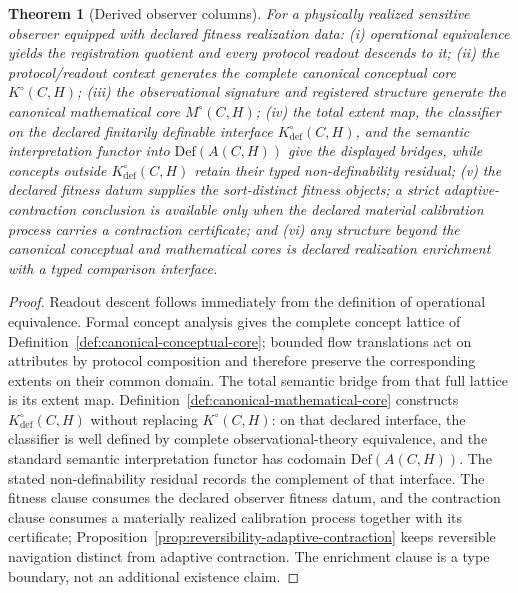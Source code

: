 \documentclass[11pt]{article}
\newtheorem{theorem}{Theorem}
\theoremstyle{definition}
\begin{document}
\begin{theorem}[Derived observer columns]
\label{thm:derived-observer-columns}
For a physically realized sensitive observer equipped with declared fitness
realization data: (i) operational equivalence yields the registration quotient
and every protocol readout descends to it; (ii) the protocol/readout context
generates the complete canonical conceptual core $K^{\circ}(C, H)$; (iii) the
observational signature and registered structure generate the canonical
mathematical core $M^{\circ}(C, H)$; (iv) the total extent map, the classifier
on the declared finitarily definable interface
$K^{\circ}_{\mathrm{def}}(C, H)$, and the semantic interpretation functor into
$\mathrm{Def}(A(C, H))$ give the displayed bridges, while concepts outside
$K^{\circ}_{\mathrm{def}}(C, H)$ retain their typed non-definability residual;
(v) the declared fitness datum supplies the sort-distinct fitness objects; a
strict adaptive-contraction conclusion is available only when the declared
material calibration process carries a contraction certificate; and (vi) any
structure beyond the canonical conceptual and mathematical cores is declared
realization enrichment with a typed comparison interface.
\end{theorem}

\begin{proof}
Readout descent follows immediately from the definition of operational
equivalence. Formal concept analysis gives the complete concept lattice of
Definition~\ref{def:canonical-conceptual-core}; bounded flow translations act
on attributes by protocol composition and therefore preserve the corresponding
extents on their common domain. The total semantic bridge from that full
lattice is its extent map.
Definition~\ref{def:canonical-mathematical-core} constructs
$K^{\circ}_{\mathrm{def}}(C, H)$ without replacing $K^{\circ}(C, H)$: on that
declared interface, the classifier is well defined by complete
observational-theory equivalence, and the standard semantic interpretation
functor has codomain $\mathrm{Def}(A(C, H))$. The stated non-definability
residual records the complement of that interface. The fitness clause consumes
the declared observer fitness datum, and the contraction clause consumes a
materially realized calibration process together with its certificate;
Proposition~\ref{prop:reversibility-adaptive-contraction} keeps reversible
navigation distinct from adaptive contraction. The enrichment clause is a
type boundary, not an additional existence claim.
\end{proof}
\end{document}
